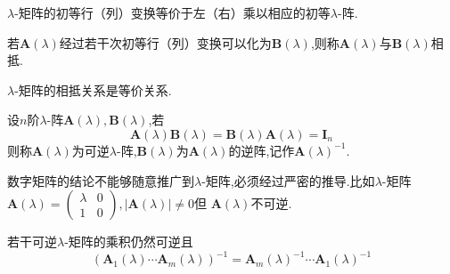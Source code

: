 \begin{formal}
\begin{theorem}\label{thm:初等多项式变换与初等多项式矩阵}
    $\lambda$-矩阵的初等行（列）变换等价于左（右）乘以相应的初等$\lambda$-阵.
\end{theorem}
\end{formal}
\begin{formal}
\begin{definition}\label{def:多项式矩阵的相抵}
    若$\bm{A}\left(\lambda\right)$经过若干次初等行（列）变换可以化为$\bm{B}\left(\lambda\right)$,则称$\bm{A}\left(\lambda\right)$与$\bm{B}\left(\lambda\right)$相抵.
\end{definition}
\end{formal}
\begin{formal}
\begin{theorem}\label{thm:多项式矩阵的相抵关系}
$\lambda$-矩阵的相抵关系是等价关系.
\end{theorem}
\end{formal}
\begin{formal}
\begin{definition}\label{def:多项式矩阵的逆阵}
    设$n$阶$\lambda$-阵$\bm{A}\left(\lambda\right),\bm{B}\left(\lambda\right)$,若\[\bm{A}\left(\lambda\right)\bm{B}\left(\lambda\right)=\bm{B}\left(\lambda\right)\bm{A}\left(\lambda\right)=\bm{I}_n\]则称$\bm{A}\left(\lambda\right)$为可逆$\lambda$-阵,$\bm{B}\left(\lambda\right)$为$\bm{A}\left(\lambda\right)$的逆阵,记作$\bm{A}\left(\lambda\right)^{-1}.$
\end{definition}
\end{formal}
\begin{red}
\begin{remark}
    数字矩阵的结论不能够随意推广到$\lambda$-矩阵,必须经过严密的推导.比如$\lambda$-矩阵$\bm{A}\left(\lambda\right)=\begin{pmatrix}
        \lambda&0\\1&0
    \end{pmatrix},\left|\bm{A}\left(\lambda\right)\right|\neq 0$但
    $\bm{A}\left(\lambda\right)$不可逆.
\end{remark}
\end{red}
\begin{formal}
\begin{theorem}\label{thm:多项式矩阵的乘积的逆阵}
        若干可逆$\lambda$-矩阵的乘积仍然可逆且
        \[
        \left(\bm{A}_1\left(\lambda\right)\cdots\bm{A}_m\left(\lambda\right)\right)^{-1}=
        \bm{A}_m\left(\lambda\right)^{-1}\cdots\bm{A}_1\left(\lambda\right)^{-1}
        \]
\end{theorem}
\end{formal}
